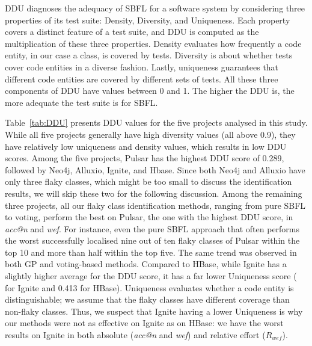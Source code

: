 DDU diagnoses the adequacy of SBFL for a software system by considering three properties of its test suite: Density, Diversity, and Uniqueness. Each property covers a distinct feature of a test suite, and DDU is computed as the multiplication of these three properties. 
Density evaluates how frequently a code entity, in our case a class, is covered by tests. Diversity is about whether tests cover code entities in a diverse fashion. Lastly, uniqueness guarantees that different code entities are covered by different sets of tests. 
All these three components of DDU have values between 0 and 1. The higher the DDU is, the more adequate the test suite is for SBFL. 

Table~\ref{tab:DDU} presents DDU values for the five projects analysed in this study. While all five projects generally have high diversity values (\ie all above 0.9), they have relatively low uniqueness and density values, which results in low DDU scores. Among the five projects, Pulsar has the highest DDU score of 0.289, followed by Neo4j, Alluxio, Ignite, and Hbase. Since both Neo4j and Alluxio have only three flaky classes, which might be too small to discuss the identification results, we will skip these two for the following discussion.
Among the remaining three projects, all our flaky class identification methods, ranging from pure SBFL to voting, perform the best on Pulsar, the one with the highest DDU score, in \textit{acc@n} and \textit{wef}. For instance, even the pure SBFL approach that often performs the worst successfully localised nine out of ten flaky classes of Pulsar within the top 10 and more than half within the top five. The same trend was observed in both GP and voting-based methods.
Compared to HBase, while Ignite has a slightly higher average for the DDU score, it has a far lower Uniqueness score ( for Ignite and 0.413 for HBase). Uniqueness evaluates whether a code entity is distinguishable; we assume that the flaky classes have different coverage than non-flaky classes. Thus, we suspect that Ignite having a lower Uniqueness is why our methods were not as effective on Ignite as on HBase: we have the worst results on Ignite in both absolute (\ie \textit{acc@n} and \textit{wef}) and relative effort (\ie $R_{wef}$). 

